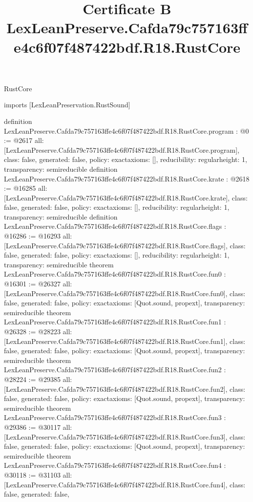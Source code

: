 \begin{lexlean}{RustCore}
\title{Certificate B LexLeanPreserve.Cafda79c757163ffe4c6f07f487422bdf.R18.RustCore}
\begin{coremodule}
imports [LexLeanPreservation.RustSound]

definition LexLeanPreserve.Cafda79c757163ffe4c6f07f487422bdf.R18.RustCore.program : @0 := @2617 {
  all: [LexLeanPreserve.Cafda79c757163ffe4c6f07f487422bdf.R18.RustCore.program],
  class: false,
  generated: false,
  policy: exact{axioms: []},
  reducibility: regular{height: 1},
  transparency: semireducible
}
definition LexLeanPreserve.Cafda79c757163ffe4c6f07f487422bdf.R18.RustCore.krate : @2618 := @16285 {
  all: [LexLeanPreserve.Cafda79c757163ffe4c6f07f487422bdf.R18.RustCore.krate],
  class: false,
  generated: false,
  policy: exact{axioms: []},
  reducibility: regular{height: 1},
  transparency: semireducible
}
definition LexLeanPreserve.Cafda79c757163ffe4c6f07f487422bdf.R18.RustCore.flags : @16286 := @16293 {
  all: [LexLeanPreserve.Cafda79c757163ffe4c6f07f487422bdf.R18.RustCore.flags],
  class: false,
  generated: false,
  policy: exact{axioms: []},
  reducibility: regular{height: 1},
  transparency: semireducible
}
theorem LexLeanPreserve.Cafda79c757163ffe4c6f07f487422bdf.R18.RustCore.fun0 : @16301 := @26327 {
  all: [LexLeanPreserve.Cafda79c757163ffe4c6f07f487422bdf.R18.RustCore.fun0],
  class: false,
  generated: false,
  policy: exact{axioms: [Quot.sound, propext]},
  transparency: semireducible
}
theorem LexLeanPreserve.Cafda79c757163ffe4c6f07f487422bdf.R18.RustCore.fun1 : @26328 := @28223 {
  all: [LexLeanPreserve.Cafda79c757163ffe4c6f07f487422bdf.R18.RustCore.fun1],
  class: false,
  generated: false,
  policy: exact{axioms: [Quot.sound, propext]},
  transparency: semireducible
}
theorem LexLeanPreserve.Cafda79c757163ffe4c6f07f487422bdf.R18.RustCore.fun2 : @28224 := @29385 {
  all: [LexLeanPreserve.Cafda79c757163ffe4c6f07f487422bdf.R18.RustCore.fun2],
  class: false,
  generated: false,
  policy: exact{axioms: [Quot.sound, propext]},
  transparency: semireducible
}
theorem LexLeanPreserve.Cafda79c757163ffe4c6f07f487422bdf.R18.RustCore.fun3 : @29386 := @30117 {
  all: [LexLeanPreserve.Cafda79c757163ffe4c6f07f487422bdf.R18.RustCore.fun3],
  class: false,
  generated: false,
  policy: exact{axioms: [Quot.sound, propext]},
  transparency: semireducible
}
theorem LexLeanPreserve.Cafda79c757163ffe4c6f07f487422bdf.R18.RustCore.fun4 : @30118 := @31103 {
  all: [LexLeanPreserve.Cafda79c757163ffe4c6f07f487422bdf.R18.RustCore.fun4],
  class: false,
  generated: false,
}
\end{coremodule}
\end{lexlean}
